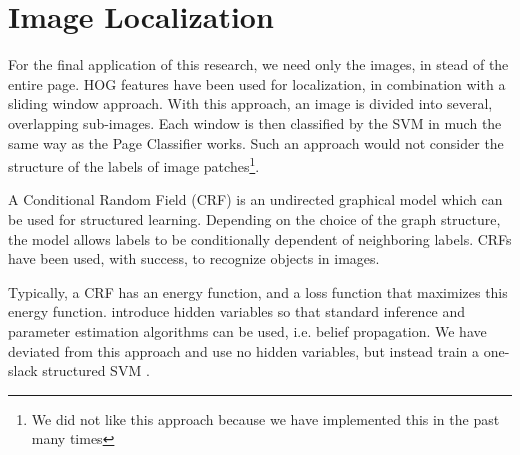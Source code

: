 \section{Image Localization}
\label{sec:imageloc}

For the final application of this research, we need only the images, in stead of
the entire page. HOG features have been used for localization, in combination
with a sliding window approach\cite{harzallah2009combining,
suard2006pedestrian}. With this approach, an image is divided into several,
overlapping sub-images. Each window is then classified by
the SVM in much the same way as the Page Classifier works. Such an approach
would not consider the structure of the labels of image
patches\footnote{We did not like this approach because we have implemented this
in the past many times}.

A Conditional Random Field (CRF) \cite{lafferty2001conditional} is an undirected
graphical model which can be used for structured learning. Depending on the
choice of the graph structure, the model allows labels to be conditionally
dependent of neighboring labels. CRFs have been used, with success, to recognize
objects in images\cite{quattoni2004conditional}.

Typically, a CRF has an energy function, and a loss function that maximizes this
energy function. \cite{quattoni2004conditional} introduce hidden variables so
that standard inference and parameter estimation algorithms can be used, i.e.
belief propagation. We have deviated from this approach and use no hidden
variables, but instead train a one-slack structured SVM \cite{joachims2009cutting}.



